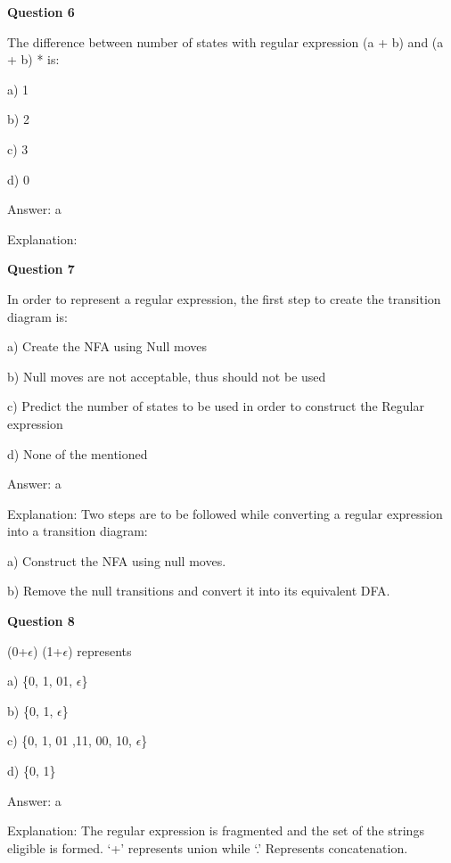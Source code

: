 \documentclass{article}
\begin{document}
\begin{mdframed}[linewidth=1pt, roundcorner=5pt, linecolor=gray!30, backgroundcolor=gray!5]
\textbf{Question 6} 

The difference between number of states with regular expression (a + b) and (a + b) * is:

a) 1

b) 2

c) 3

d) 0
\vspace{5pt} \par
\begin{tcolorbox}[colback=green!5, colframe=green!40!black, title=Solution]
Answer: a

Explanation:
\end{tcolorbox}
\end{mdframed}
\newpage

\begin{mdframed}[linewidth=1pt, roundcorner=5pt, linecolor=gray!30, backgroundcolor=gray!5]
\textbf{Question 7} 

In order to represent a regular expression, the first step to create the transition diagram is:

a) Create the NFA using Null moves

b)  Null moves are not acceptable, thus should not be used

c) Predict the number of states to be used in order to construct the Regular expression

d) None of the mentioned
\vspace{5pt} \par
\begin{tcolorbox}[colback=green!5, colframe=green!40!black, title=Solution]
Answer: a

Explanation: Two steps are to be followed while converting a regular expression into a transition diagram:

a) Construct the NFA using null moves.

b) Remove the null transitions and convert it into its equivalent DFA.
\end{tcolorbox}
\end{mdframed}

\begin{mdframed}[linewidth=1pt, roundcorner=5pt, linecolor=gray!30, backgroundcolor=gray!5]
\textbf{Question 8} 

(0+$\epsilon$) (1+$\epsilon$) represents

a) \{0, 1, 01, $\epsilon$\}

b) \{0, 1, $\epsilon$\}

c) \{0, 1, 01 ,11, 00, 10, $\epsilon$\}

d) \{0, 1\}
\vspace{5pt} \par
\begin{tcolorbox}[colback=green!5, colframe=green!40!black, title=Solution]
Answer: a

Explanation: The regular expression is fragmented and the set of the strings eligible is formed. ‘+' represents union while ‘.' Represents concatenation.
\end{tcolorbox}
\end{mdframed}
\end{document}
